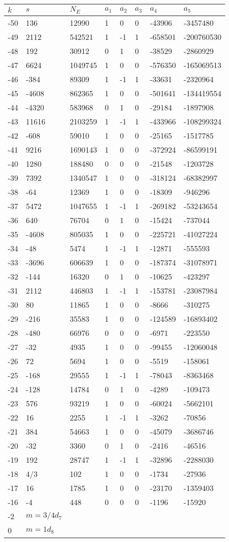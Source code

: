 \documentclass{amsart}
\begin{document}
\begin{longtable}{|l|l|l|lllll|}
\hline
$k$ & $s$ & $N_E$ & $a_1$ & $a_2$ & $a_3$ & $a_4$ & $a_5$\\
\hline
-50&136&12990&1&0&0&-43906&-3457480\\
-49&2112&542521&1&-1&1&-658501&-200760530\\
-48&192&30912&0&1&0&-38529&-2860929\\
-47&6624&1049745&1&0&0&-576350&-165069513\\
-46&-384&89309&1&-1&1&-33631&-2320964\\
-45&-4608&862365&1&0&0&-501641&-134419554\\
-44&-4320&583968&0&1&0&-29184&-1897908\\
-43&11616&2103259&1&-1&1&-433966&-108299324\\
-42&-608&59010&1&0&0&-25165&-1517785\\
-41&9216&1690143&1&0&0&-372924&-86599191\\
-40&1280&188480&0&0&0&-21548&-1203728\\
-39&7392&1340547&1&0&0&-318124&-68382997\\
-38&-64&12369&1&0&0&-18309&-946296\\
-37&5472&1047655&1&-1&1&-269182&-53243654\\
-36&640&76704&0&1&0&-15424&-737044\\
-35&-4608&805035&1&0&0&-225721&-41027224\\
-34&-48&5474&1&-1&1&-12871&-555593\\
-33&-3696&606639&1&0&0&-187374&-31078971\\
-32&-144&16320&0&1&0&-10625&-423297\\
-31&2112&446803&1&-1&1&-153781&-23087984\\
-30&80&11865&1&0&0&-8666&-310275\\
-29&-216&35583&1&0&0&-124589&-16893402\\
-28&-480&66976&0&0&0&-6971&-223550\\
-27&-32&4935&1&0&0&-99455&-12060048\\
-26&72&5694&1&0&0&-5519&-158061\\
-25&-168&29555&1&-1&1&-78043&-8363468\\
-24&-128&14784&0&1&0&-4289&-109473\\
-23&576&93219&1&0&0&-60024&-5662101\\
-22&16&2255&1&-1&1&-3262&-70856\\
-21&384&54663&1&0&0&-45079&-3686746\\
-20&-32&3360&0&1&0&-2416&-46516\\
-19&192&28747&1&-1&1&-32896&-2288030\\
-18&4/3&102&1&0&0&-1734&-27936\\
-17&16&1785&1&0&0&-23170&-1359403\\
-16&-4&448&0&0&0&-1196&-15920\\
-2&$m=3/4d_{7}$&&\multicolumn{5}{c|}{}\\
0&$m=1d_{8}$&&\multicolumn{5}{c|}{}\\
\hline
\end{longtable}
\end{document}

